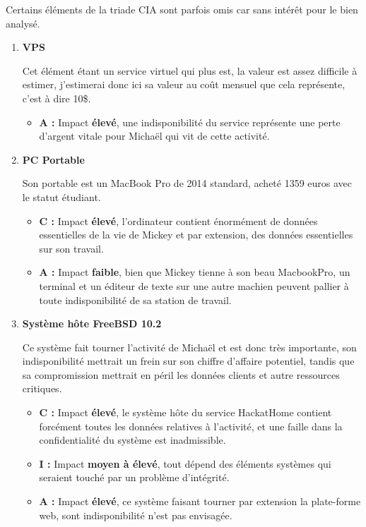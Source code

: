 \documentclass[a4paper,10pt,final,fleqn]{article}
\begin{document}
				Certains éléments de la triade CIA sont parfois omis car sans intérêt pour le bien analysé. \\

				\begin{enumerate}
					\item \textbf{VPS}

						Cet élément étant un service virtuel qui plus est, la valeur est assez difficile à estimer, j'estimerai donc ici sa valeur au coût mensuel que cela représente, c'est à dire 10\$.

						\begin{itemize}
							\item \textbf{A : } Impact \textbf{élevé}, une indisponibilité du service représente une perte d'argent vitale pour Michaël qui vit de cette activité.\\
						\end{itemize}

					\item \textbf{PC Portable}

						Son portable est un MacBook Pro de 2014 standard, acheté 1359 euros avec le statut étudiant.\\

						\begin{itemize}
							\item \textbf{C : } Impact \textbf{élevé}, l'ordinateur contient énormément de données essentielles de la vie de Mickey et par extension, des données essentielles sur son travail.
							\item \textbf{A : } Impact \textbf{faible}, bien que Mickey tienne à son beau MacbookPro, un terminal et un éditeur de texte sur une autre machien peuvent pallier à toute indisponibilité de sa station de travail.
						\end{itemize}

					\item \textbf{Système hôte FreeBSD 10.2}

						Ce système fait tourner l'activité de Michaël et est donc très importante, son indisponibilité mettrait un frein sur son chiffre d'affaire potentiel, tandis que sa compromission mettrait en péril les données clients et autre ressources critiques.\\

						\begin{itemize}
							\item \textbf{C : } Impact \textbf{élevé}, le système hôte du service HackatHome contient forcément toutes les données relatives à l'activité, et une faille dans la confidentialité du système est inadmissible.
							\item \textbf{I : } Impact \textbf{moyen à élevé}, tout dépend des éléments systèmes qui seraient touché par un problème d'intégrité.
							\item \textbf{A : } Impact \textbf{élevé}, ce système faisant tourner par extension la plate-forme web, sont indisponibilité n'est pas envisagée.
						\end{itemize}


\end{enumerate}
\end{document}

